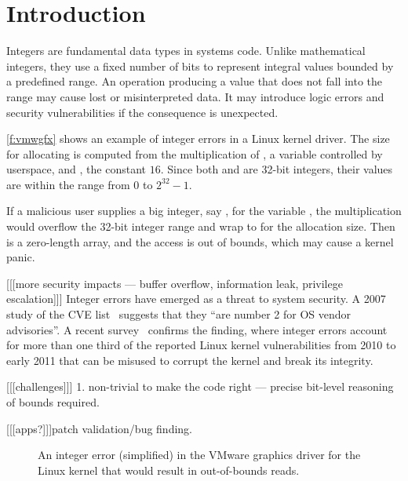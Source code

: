 \section{Introduction}
\label{s:intro}

Integers are fundamental data types in systems code.  Unlike
mathematical integers, they use a fixed number of bits to represent
integral values bounded by a predefined range.  An operation producing
a value that does not fall into the range may cause lost or
misinterpreted data.  It may introduce logic errors and security
vulnerabilities if the consequence is unexpected.

\autoref{f:vmwgfx} shows an example of integer errors in a Linux
kernel driver.  The size for allocating  is computed from
the multiplication of , a variable controlled
by userspace, and , the constant
$16$.  Since both  and  are 32-bit
integers, their values are within the range from 0 to $2^{32} - 1$.

If a malicious user supplies a big integer, say ,
for the variable , the multiplication would
overflow the 32-bit integer range and wrap to  for the allocation size.  Then  is a zero-length
array, and the access  is out of bounds, which may
cause a kernel panic.

[[[more security impacts --- buffer overflow, information leak,
privilege escalation]]]
Integer errors have emerged as a threat to system security.  A 2007
study of the CVE list~\cite{christey:vuln} suggests that they ``are
number 2 for OS vendor advisories''.  A recent survey~\cite{chen:kbugs}
confirms the finding, where integer errors account for more than
one third of the reported Linux kernel vulnerabilities from 2010
to early 2011 that can be misused to corrupt the kernel and break
its integrity.

[[[challenges]]]
1. non-trivial to make the code right
--- precise bit-level reasoning of bounds required.

[[[apps?]]]patch validation/bug finding.

\begin{figure}

\caption{An integer error (simplified) in the VMware graphics driver
for the Linux kernel that would result in out-of-bounds reads.}
\label{f:vmwgfx}
\end{figure}
